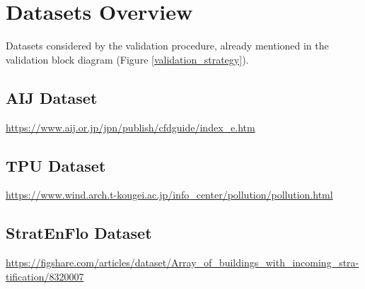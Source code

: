 
\section{Datasets Overview}
Datasets considered by the validation procedure, already mentioned in the validation block diagram (Figure \ref{validation_strategy}).

\subsection{AIJ Dataset}
\url{https://www.aij.or.jp/jpn/publish/cfdguide/index_e.htm}\newline

\subsection{TPU Dataset}
\url{https://www.wind.arch.t-kougei.ac.jp/info_center/pollution/pollution.html}\newline

\subsection{StratEnFlo Dataset}
\url{https://figshare.com/articles/dataset/Array_of_buildings_with_incoming_stra-tification/8320007}\newline

